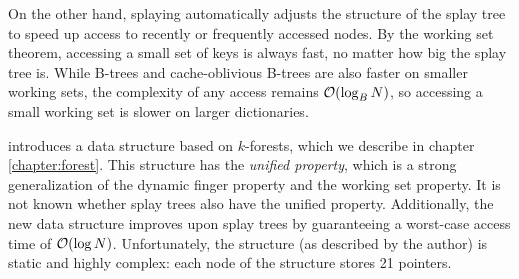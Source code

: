 On the other hand, splaying automatically adjusts the structure of the splay
tree to speed up access to recently or frequently accessed nodes. By the
working set theorem, accessing a small set of keys is always fast, no matter
how big the splay tree is. While B-trees and cache-oblivious B-trees are
also faster on smaller working sets, the complexity of any access remains
$\mathcal{O}(\log_B N)$, so accessing a small working set is slower on larger
dictionaries.

\cite{alternatives-to-splay-trees} introduces a data structure based
on $k$-forests, which we describe in chapter \ref{chapter:forest}.
This structure has the \textit{unified property}, which is a strong
generalization of the dynamic finger property and the working set property.
It is not known whether splay trees also have the unified property.
Additionally, the new data structure improves upon splay trees by guaranteeing
a worst-case access time of $\mathcal{O}(\log N)$. Unfortunately, the structure
(as described by the author) is static and highly complex: each node of
the structure stores 21 pointers.
